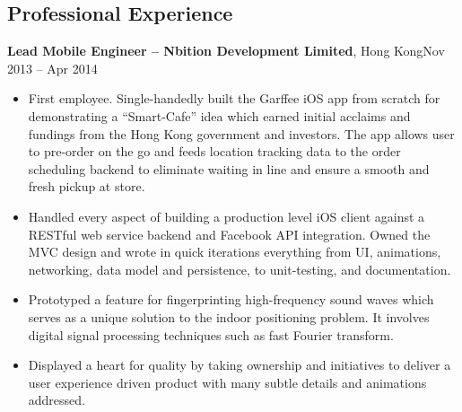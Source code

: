 \documentclass[margin,line]{res}
\newcommand{\sstyle}{\sc}
\begin{document}
\begin{resume}
  \section{\sstyle Professional Experience}
  {\bf Lead Mobile Engineer -- Nbition Development Limited}, Hong Kong\hfill Nov 2013 -- Apr 2014
  \vspace{.05in}
  \begin{itemize}
  \item First employee. Single-handedly built the Garffee iOS app from scratch
        for demonstrating a ``Smart-Cafe'' idea which earned initial acclaims
        and fundings from the Hong Kong government and investors.
        The app allows user to pre-order on the go and feeds location tracking
        data to the order scheduling backend to eliminate waiting in line and
        ensure a smooth and fresh pickup at store.
  \item Handled every aspect of building a production level iOS client against a
        RESTful web service backend and Facebook API integration. Owned the MVC
        design and wrote in quick iterations everything from UI, animations,
        networking, data model and persistence, to unit-testing, and
        documentation.
  \item Prototyped a feature for fingerprinting high-frequency sound waves
        which serves as a unique solution to the indoor positioning problem.
        It involves digital signal processing techniques such as fast Fourier
        transform.
  \item Displayed a heart for quality by taking ownership and initiatives to
        deliver a user experience driven product with many subtle details and
        animations addressed.
  \end{itemize}


\end{resume}
\end{document}
